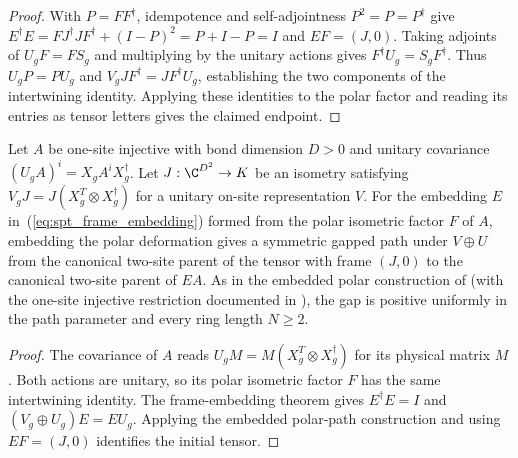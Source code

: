 \begin{proof}\leanok
    With $P=FF^\dagger$, idempotence and self-adjointness $P^2=P=P^\dagger$
    give $E^\dagger E=FJ^\dagger JF^\dagger+(I-P)^2=P+I-P=I$ and $EF=(J,0)$.
    Taking adjoints of $U_gF=FS_g$ and multiplying by the unitary actions
    gives $F^\dagger U_g=S_gF^\dagger$. Thus $U_gP=PU_g$ and
    $V_gJF^\dagger=JF^\dagger U_g$, establishing the two components of the
    intertwining identity. Applying these identities to the polar factor and
    reading its entries as tensor letters gives the claimed endpoint.
\end{proof}

\begin{definition}
    \label{def:spt_polar_frame_path}
    \leanok
    Let $A$ be one-site injective with bond dimension $D>0$ and unitary
    covariance $(U_g A)^i=X_gA^iX_g^\dagger$.
    Let $J:\C^{D^2}\to K$ be an isometry satisfying
    $V_gJ=J(X_g^T\otimes X_g^\dagger)$ for a unitary on-site
    representation $V$. For the embedding $E$ in~(\ref{eq:spt_frame_embedding})
    formed from the polar isometric factor $F$ of $A$,
    embedding the polar deformation gives a symmetric gapped path under
    $V\oplus U$ from the canonical two-site parent of the tensor with frame
    $(J,0)$ to the canonical two-site parent of $EA$.
    As in the embedded polar construction of
    \cite[Sections~II.C and II.F.2]{Schuch2011Phases} (with the one-site
    injective restriction documented in
    \cite{gap:spc11_uniform_gap_injective_scope}), the gap is positive
    uniformly in the path parameter and every ring length $N\ge2$.
\end{definition}

\begin{proof}\leanok
    The covariance of $A$ reads $U_gM=M(X_g^T\otimes X_g^\dagger)$
    for its physical matrix $M$. Both actions are unitary, so its polar
    isometric factor $F$ has the same intertwining identity.
    The frame-embedding theorem gives $E^\dagger E=I$ and
    $(V_g\oplus U_g)E=EU_g$.
    Applying the embedded polar-path construction and using $EF=(J,0)$
    identifies the initial tensor.
\end{proof}

